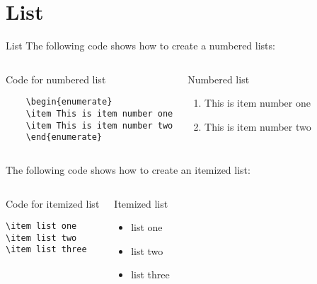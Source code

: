 \documentclass[10pt,xcolor=x11names]{beamer}
\begin{document}
\section{List}
\begin{frame}{List}
The following code shows how to create a numbered lists:

\vspace{-10pt}
\begin{columns}[t]

\begin{exampleblock}{Code for numbered list}
	\begin{verbatim}
	\begin{enumerate}
	\item This is item number one
	\item This is item number two
	\end{enumerate}
	\end{verbatim}
\end{exampleblock}


\begin{exampleblock}{Numbered list}
	\begin{enumerate}
		\item This is item number one
		\item This is item number two
	\end{enumerate}
\end{exampleblock}
\end{columns} \vspace{10pt}

The following code shows how to create an  itemized list:
\vspace{-10pt}
\begin{columns}[t]
	
	\begin{exampleblock}{Code for itemized list}
		\begin{verbatim}
\item list one 
\item list two 
\item list three 
		\end{verbatim}
	\end{exampleblock}
	
	
	\begin{exampleblock}{Itemized list}
		 \begin{itemize}
			\item list one 
			\item list two 
			\item list three 
		\end{itemize}
	\end{exampleblock}
\end{columns}


\end{frame}
\end{document}
